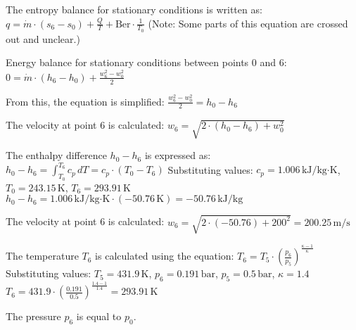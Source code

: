 The entropy balance for stationary conditions is written as:  
\( q = \dot{m} \cdot (s_6 - s_0) + \frac{Q}{T} + \text{Ber} \cdot \frac{1}{T_0} \)  
(Note: Some parts of this equation are crossed out and unclear.)  

Energy balance for stationary conditions between points 0 and 6:  
\( 0 = \dot{m} \cdot (h_6 - h_0) + \frac{w_6^2 - w_0^2}{2} \)  

From this, the equation is simplified:  
\( \frac{w_6^2 - w_0^2}{2} = h_0 - h_6 \)  

The velocity at point 6 is calculated:  
\( w_6 = \sqrt{2 \cdot (h_0 - h_6) + w_0^2} \)  

The enthalpy difference \( h_0 - h_6 \) is expressed as:  
\( h_0 - h_6 = \int_{T_0}^{T_6} c_p \, dT = c_p \cdot (T_0 - T_6) \)  
Substituting values:  
\( c_p = 1.006 \, \text{kJ/kg·K} \), \( T_0 = 243.15 \, \text{K} \), \( T_6 = 293.91 \, \text{K} \)  
\( h_0 - h_6 = 1.006 \, \text{kJ/kg·K} \cdot (-50.76 \, \text{K}) = -50.76 \, \text{kJ/kg} \)  

The velocity at point 6 is calculated:  
\( w_6 = \sqrt{2 \cdot (-50.76) + 200^2} = 200.25 \, \text{m/s} \)  

The temperature \( T_6 \) is calculated using the equation:  
\( T_6 = T_5 \cdot \left( \frac{p_6}{p_5} \right)^{\frac{\kappa - 1}{\kappa}} \)  
Substituting values:  
\( T_5 = 431.9 \, \text{K} \), \( p_6 = 0.191 \, \text{bar} \), \( p_5 = 0.5 \, \text{bar} \), \( \kappa = 1.4 \)  
\( T_6 = 431.9 \cdot \left( \frac{0.191}{0.5} \right)^{\frac{1.4 - 1}{1.4}} = 293.91 \, \text{K} \)  

The pressure \( p_6 \) is equal to \( p_0 \).